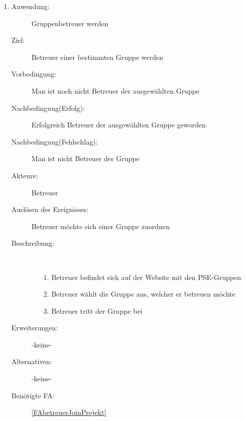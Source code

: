 \documentclass[parskip=full]{scrartcl}
\newcommand{\swtLabel}[1]{\textbf{/#1\arabic*0/}}
\begin{document}
\begin{enumerate} [label=\swtLabel{B}]
 
  \item \label{UCbetreuerJoinProjekt}
	\begin{description}
  		\item[Anwendung:] Gruppenbetreuer werden
  		\item[Ziel:] Betreuer einer bestimmten Gruppe werden
  		\item[Vorbedingung:] Man ist noch nicht Betreuer der ausgewählten Gruppe
  		\item[Nachbedingung(Erfolg):] Erfolgreich Betreuer der ausgewählten
  		Gruppe geworden
  		\item[Nachbedingung(Fehlschlag):] Man ist nicht Betreuer der Gruppe
  		\item[Akteure:] Betreuer
  		\item[Auslösen des Ereignisses:] Betreuer möchte sich einer Gruppe
  		zuordnen
  		\item[Beschreibung:]~
  	\begin{enumerate} 
  	  \item[1.] Betreuer befindet sich auf der Website mit den \gls{PSE}-Gruppen
  	  \item[2.] Betreuer wählt die Gruppe aus, welcher er betreuen möchte
  	  \item[3.] Betreuer tritt der Gruppe bei
  	\end{enumerate}
  	\item[Erweiterungen:] -keine-
  	\item[Alternativen:] -keine-
  	\item[Benötigte FA:] \ref{FAbetreuerJoinProjekt}
  \end{description}
  

\end{enumerate}
\end{document}
